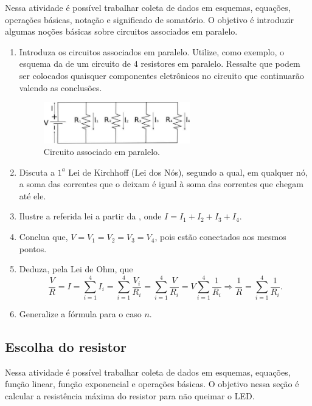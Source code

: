\documentclass{textolivre}
\begin{document}
Nessa atividade é possível trabalhar coleta de dados em esquemas, equações,
operações básicas, notação e significado de somatório. O objetivo é introduzir
algumas noções básicas sobre circuitos associados em paralelo.


\begin{enumerate}
\item Introduza os circuitos associados em paralelo. Utilize, como exemplo, o
esquema da  de um circuito de 4 resistores em paralelo. Ressalte que
podem ser colocados quaisquer componentes eletrônicos no circuito que
continuarão valendo as conclusões.

\begin{figure}[h!]
\centering
\includegraphics[width=0.6\textwidth]{figure-30.pdf}
\caption{Circuito associado em paralelo.}
\label{fig20}
\end{figure}

\item Discuta a $1^a$ Lei de Kirchhoff (Lei dos Nós), segundo a qual, em qualquer
nó, a soma das correntes que o deixam é igual à soma das correntes que chegam
até ele.

\item Ilustre a referida lei a partir da , onde $I=I_1+I_2+I_3+I_4$.
\item Conclua que, $V=V_1=V_2=V_3=V_4$, pois estão conectados aos mesmos pontos.
\item Deduza, pela Lei de Ohm, que
\begin{equation*}
\frac{V}{R} = I = \sum_{i=1}^{4} I_i = \sum_{i=1}^{4} \frac{V_i}{R_i} = \sum_{i=1}^{4} \frac{V}{R_i} = V \sum_{i=1}^{4} \frac{1}{R_i} \Rightarrow \frac{1}{R} = \sum_{i=1}^{4} \frac{1}{R_i} .
\end{equation*}
\item Generalize a fórmula para o caso $n$.
\end{enumerate}


\subsection{Escolha do resistor}\label{sec-escolha-R}
Nessa atividade é possível trabalhar coleta de dados em esquemas, equações,
função linear, função exponencial e operações básicas. O objetivo nessa seção é
calcular a resistência máxima do resistor para não queimar o LED.
\end{document}
